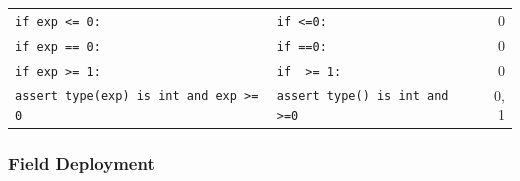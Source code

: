 \begin{table}
\begin{tabular}{l l r}
\footnotesize{\texttt{if exp <= 0:}} & \footnotesize{\texttt{if \underline{\hspace{1em}}<=0:}} & 0 \\
\footnotesize{\texttt{if exp == 0:}} & \footnotesize{\texttt{if \underline{\hspace{1em}}==0:}} & 0 \\
\footnotesize{\texttt{if exp >= 1:}} & \footnotesize{\texttt{if \underline{\hspace{1em}} >= 1:}} & 0 \\
\footnotesize{\texttt{assert type(exp) is int and exp >= 0}} & \footnotesize{\texttt{assert type(\underline{\hspace{1em}}) is int and \underline{\hspace{1em}}>=0}} & 0, 1 \\
\end{tabular}
\label{table:template-location}
\end{table}



\subsubsection{Field Deployment}

